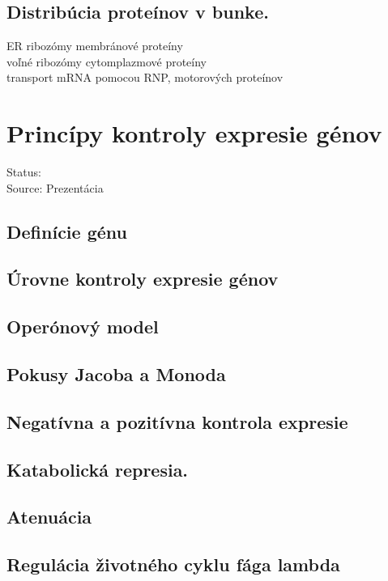 \subsection{Distribúcia proteínov v bunke.}
ER ribozómy \ra membránové proteíny\\
voľné ribozómy \ra cytomplazmové proteíny\\
transport mRNA pomocou RNP, motorových proteínov\\
\section{Princípy kontroly expresie génov}

Status: \\
Source: Prezentácia \\

\subsection{Definície génu}

\subsection{Úrovne kontroly expresie génov}

\subsection{Operónový model}

\subsection{Pokusy Jacoba a Monoda}

\subsection{Negatívna a pozitívna kontrola expresie}

\subsection{Katabolická represia.}

\subsection{Atenuácia}

\subsection{Regulácia životného cyklu fága lambda}

